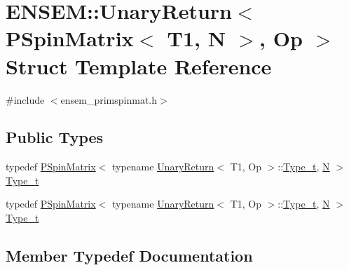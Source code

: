 \hypertarget{structENSEM_1_1UnaryReturn_3_01PSpinMatrix_3_01T1_00_01N_01_4_00_01Op_01_4}{}\section{E\+N\+S\+EM\+:\+:Unary\+Return$<$ P\+Spin\+Matrix$<$ T1, N $>$, Op $>$ Struct Template Reference}
\label{structENSEM_1_1UnaryReturn_3_01PSpinMatrix_3_01T1_00_01N_01_4_00_01Op_01_4}


{\ttfamily \#include $<$ensem\+\_\+primspinmat.\+h$>$}

\subsection*{Public Types}
\begin{DoxyCompactItemize}
\item 
typedef \mbox{\hyperlink{classENSEM_1_1PSpinMatrix}{P\+Spin\+Matrix}}$<$ typename \mbox{\hyperlink{structENSEM_1_1UnaryReturn}{Unary\+Return}}$<$ T1, Op $>$\+::\mbox{\hyperlink{structENSEM_1_1UnaryReturn_3_01PSpinMatrix_3_01T1_00_01N_01_4_00_01Op_01_4_a722e6dd982e4f02e3281bc8a3b8f8bfa}{Type\+\_\+t}}, \mbox{\hyperlink{operator__name__util_8cc_a7722c8ecbb62d99aee7ce68b1752f337}{N}} $>$ \mbox{\hyperlink{structENSEM_1_1UnaryReturn_3_01PSpinMatrix_3_01T1_00_01N_01_4_00_01Op_01_4_a722e6dd982e4f02e3281bc8a3b8f8bfa}{Type\+\_\+t}}
\item 
typedef \mbox{\hyperlink{classENSEM_1_1PSpinMatrix}{P\+Spin\+Matrix}}$<$ typename \mbox{\hyperlink{structENSEM_1_1UnaryReturn}{Unary\+Return}}$<$ T1, Op $>$\+::\mbox{\hyperlink{structENSEM_1_1UnaryReturn_3_01PSpinMatrix_3_01T1_00_01N_01_4_00_01Op_01_4_a722e6dd982e4f02e3281bc8a3b8f8bfa}{Type\+\_\+t}}, \mbox{\hyperlink{operator__name__util_8cc_a7722c8ecbb62d99aee7ce68b1752f337}{N}} $>$ \mbox{\hyperlink{structENSEM_1_1UnaryReturn_3_01PSpinMatrix_3_01T1_00_01N_01_4_00_01Op_01_4_a722e6dd982e4f02e3281bc8a3b8f8bfa}{Type\+\_\+t}}
\end{DoxyCompactItemize}


\subsection{Member Typedef Documentation}
\mbox{\label{structENSEM_1_1UnaryReturn_3_01PSpinMatrix_3_01T1_00_01N_01_4_00_01Op_01_4_a722e6dd982e4f02e3281bc8a3b8f8bfa}} 
